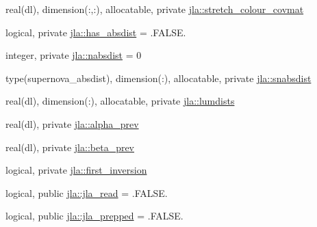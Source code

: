 \begin{DoxyCompactItemize}
\item 
real(dl), dimension(\+:,\+:), allocatable, private \mbox{\hyperlink{namespacejla_a22070c0614b05ee2b305729eddeb3d9d}{jla\+::stretch\+\_\+colour\+\_\+covmat}}
\item 
logical, private \mbox{\hyperlink{namespacejla_a2eb95509fe329afa263dcfa2727d6b41}{jla\+::has\+\_\+absdist}} = .F\+A\+L\+S\+E.
\item 
integer, private \mbox{\hyperlink{namespacejla_ac196ce11e9bc46a1f0f7190de071358a}{jla\+::nabsdist}} = 0
\item 
type(supernova\+\_\+absdist), dimension(\+:), allocatable, private \mbox{\hyperlink{namespacejla_ac714ae18a12d4b4a726b05c017fd1e92}{jla\+::snabsdist}}
\item 
real(dl), dimension(\+:), allocatable, private \mbox{\hyperlink{namespacejla_a488389e4c0ef651c499c3c48d6bee7ef}{jla\+::lumdists}}
\item 
real(dl), private \mbox{\hyperlink{namespacejla_ade47fc5cee67934ebf1deb3f971e55ba}{jla\+::alpha\+\_\+prev}}
\item 
real(dl), private \mbox{\hyperlink{namespacejla_a6ce045a151cda5e7f1d37adeac58eb4d}{jla\+::beta\+\_\+prev}}
\item 
logical, private \mbox{\hyperlink{namespacejla_a7e32750158b057376c58db729873f935}{jla\+::first\+\_\+inversion}}
\item 
logical, public \mbox{\hyperlink{namespacejla_a408c4f01bb785e06e2a2555aa770e090}{jla\+::jla\+\_\+read}} = .F\+A\+L\+S\+E.
\item 
logical, public \mbox{\hyperlink{namespacejla_a8a48484fda3925329cb345d9b671b56b}{jla\+::jla\+\_\+prepped}} = .F\+A\+L\+S\+E.
\end{DoxyCompactItemize}
